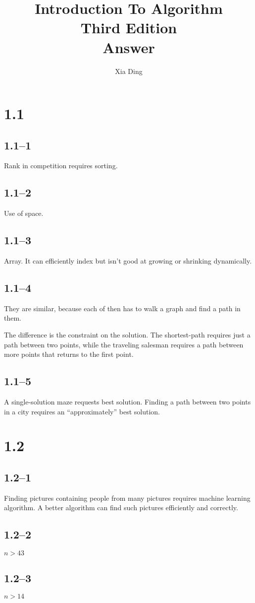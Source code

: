 \documentclass{article}
\author{Xia Ding}
\title{\textbf{Introduction To Algorithm}\\Third Edition\\\textbf{Answer}}
\begin{document}
\maketitle

\section*{1.1}
\subsection*{1.1--1}
Rank in competition requires sorting.

\subsection*{1.1--2}
Use of space.

\subsection*{1.1--3}
Array. It can efficiently index but isn't good at growing or shrinking
dynamically.

\subsection*{1.1--4}
They are similar, because each of then has to walk a graph and find a path in them.

The difference is the constraint on the solution. The shortest-path requires
just a  path between two points, while the traveling salesman requires a path
between more  points that returns to the first point.

\subsection*{1.1--5}
A single-solution maze requests best solution. Finding a path between two points
in a city requires an ``approximately'' best solution.


\section*{1.2}
\subsection*{1.2--1}
Finding  pictures containing people from many pictures requires machine learning
algorithm. A better algorithm can find such pictures efficiently and correctly.

\subsection*{1.2--2}
$n > 43$

\subsection*{1.2--3}
$n > 14$
\end{document}
